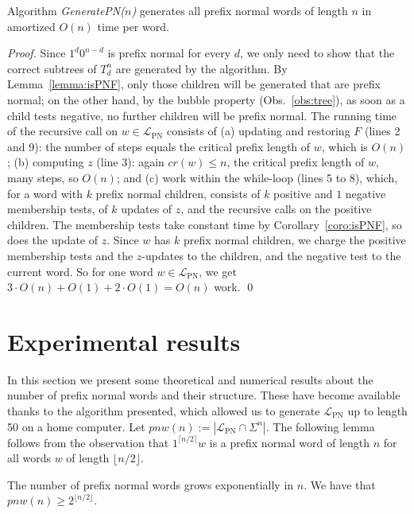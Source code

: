 \documentclass[11pt,a4paper]{llncs}
\newcommand{\LPN}{{\mathcal L}_{\textrm{PN}}}
\begin{document}
\begin{theorem}
Algorithm {\em GeneratePN($n$)} generates all prefix normal words of length $n$ in amortized $O(n)$ time per word. 
\end{theorem}

\begin{proof}
Since $1^d0^{n-d}$ is prefix normal for every $d$, we only need to show that the correct subtrees of $T_d^n$ are generated by the algorithm. By Lemma~\ref{lemma:isPNF}, only those children will be generated that are prefix normal; on the other hand, by the bubble property (Obs.~\ref{obs:tree}), as soon as a child tests negative, no further children will be prefix normal. The running time of the recursive call on $w\in \LPN$ consists of (a) updating and restoring $F$ (lines 2 and 9): the number of steps equals the critical prefix length of $w$, which is $O(n)$; (b) computing $z$ (line 3): again $cr(w)\leq n$, the critical prefix length of $w$, many steps, so $O(n)$; and (c) work within the while-loop (lines 5 to 8), which, for a word with $k$ prefix normal children, consists of $k$ positive and $1$ negative membership tests, of $k$ updates of $z$, and the recursive calls on the positive children. The membership tests take constant time by Corollary~\ref{coro:isPNF}, so does the update of $z$. Since $w$ has $k$ prefix normal children, we charge the positive membership tests and the $z$-updates to the children, and the negative test to the current word.
So for one word $w\in \LPN$, we get $3\cdot O(n) + O(1) + 2\cdot O(1) = O(n)$ work.
\hfill \qed 
\end{proof}




\section{Experimental results}
\newcommand{\pnn}{\ensuremath{\textit{pnw}}}

In this section we present some theoretical and numerical results about the number of prefix normal words and their structure. These have become available thanks to the algorithm presented, which allowed us to generate $\LPN$ up to length 50 on a home computer. 
Let $\pnn(n) := |\LPN \cap \Sigma^n|$. The following lemma follows from the observation that $1^{\lceil n/2 \rceil} w$ is a prefix normal word of length $n$ for all words $w$ of length $\lfloor n/2 \rfloor$.

\begin{lemma}
The number of prefix normal words grows exponentially in $n$. We have that $\pnn(n) \geq 2^{\lfloor n/2\rfloor}$. 
\end{lemma}
\end{document}
